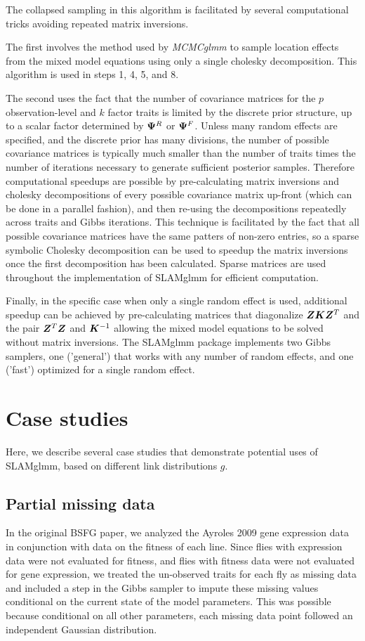 \documentclass[11pt]{amsart}
\newcommand*{\B}[1]{\ifmmode\bm{#1}\else\textbf{#1}\fi}
\begin{document}
The collapsed sampling in this algorithm is facilitated by several computational tricks avoiding repeated matrix inversions. 

The first involves the method used by \emph{MCMCglmm} to sample location effects from the mixed model equations using only a single cholesky decomposition. This algorithm is used in steps 1, 4, 5, and 8.

The second uses the fact that the number of covariance matrices for the $p$ observation-level and $k$ factor traits is limited by the discrete prior structure, up to a scalar factor determined by $\B{\Psi}^R$ or $\B{\Psi}^F$. Unless many random effects are specified, and the discrete prior has many divisions, the number of possible covariance matrices is typically much smaller than the  number of traits times the number of iterations necessary to generate sufficient posterior samples. Therefore computational speedups are possible by pre-calculating matrix inversions and cholesky decompositions of every possible covariance matrix up-front (which can be done in a parallel fashion), and then re-using the decompositions repeatedly across traits and Gibbs iterations.
This technique is facilitated by the fact that all possible covariance matrices have the same patters of non-zero entries, so a sparse symbolic Cholesky decomposition can be used to speedup the matrix inversions once the first decomposition has been calculated. Sparse matrices are used throughout the implementation of SLAMglmm for efficient computation.

Finally, in the specific case when only a single random effect is used, additional speedup can be achieved by pre-calculating matrices that diagonalize $\B{ZKZ}^T$ and the pair $\B{Z}^T\B{Z}$ and $\B{K}^{-1}$ allowing the mixed model equations to be solved without matrix inversions. The SLAMglmm package implements two Gibbs samplers, one ('general') that works with any number of random effects, and one ('fast') optimized for a single random effect.

\section{Case studies}
\label{link_functions}
Here, we describe several case studies that demonstrate potential uses of SLAMglmm, based on different link distributions $g$.

\subsection{Partial missing data}
In the original BSFG paper, we analyzed the Ayroles 2009 gene expression data in conjunction with data on the fitness of each line. Since flies with expression data were not evaluated for fitness, and flies with fitness data were not evaluated for gene expression, we treated the un-observed traits for each fly as missing data and included a step in the Gibbs sampler to impute these missing values conditional on the current state of the model parameters. This was possible because conditional on all other parameters, each missing data point followed an independent Gaussian distribution.
\end{document}
